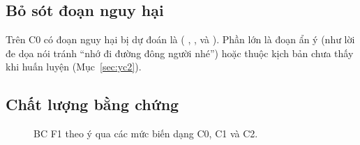 \subsection{Bỏ sót đoạn nguy hại}

Trên C0 có  đoạn nguy hại bị dự đoán là 
( ,  ,   và
 ). Phần lớn là đoạn ẩn ý (như lời đe dọa nói tránh ``nhớ đi đường đông người nhé'') hoặc thuộc kịch bản
chưa thấy khi huấn luyện (Mục~\ref{sec:yc2}).

\subsection{Chất lượng bằng chứng}

\begin{figure}[H]
\centering

\caption{BC F1 theo ý qua các mức biến dạng C0, C1 và C2.}
\label{fig:p2-bc-bien-dang}
\end{figure}

